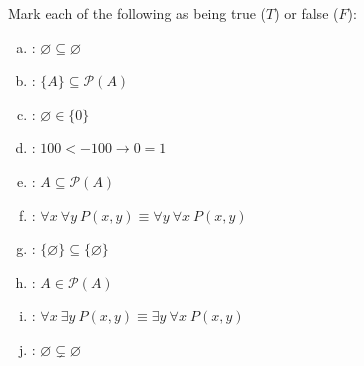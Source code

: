 \documentclass[12pt,letterpaper]{exam}
\begin{document}
\begin{questions}
\newpage
\question[10] Mark each of the following as being true ($T$) or false ($F$): \pspace
        \begin{enumerate}[(a)]
        \item \underline{\hspace{1.5cm}}: $\varnothing \subseteq \varnothing$ \vfill
        \item \underline{\hspace{1.5cm}}: $\{ A \} \subseteq \mathcal{P}(A)$ \vfill
        \item \underline{\hspace{1.5cm}}: $\varnothing \in \{ 0 \}$ \vfill
        \item \underline{\hspace{1.5cm}}: $100 < -100 \to 0= 1$ \vfill
        \item \underline{\hspace{1.5cm}}: $A \subseteq \mathcal{P}(A)$ \vfill
        \item \underline{\hspace{1.5cm}}: $\forall x\ \forall y\ P(x, y) \equiv \forall y\ \forall x\ P(x, y)$ \vfill
        \item \underline{\hspace{1.5cm}}: $\{ \varnothing \} \subseteq \{ \varnothing \}$ \vfill
        \item \underline{\hspace{1.5cm}}: $A \in \mathcal{P}(A)$ \vfill
        \item \underline{\hspace{1.5cm}}: $\forall x\ \exists y\ P(x, y) \equiv \exists y\ \forall x\ P(x, y)$ \vfill
        \item \underline{\hspace{1.5cm}}: $\varnothing \subsetneq \varnothing$ \vfill
        \end{enumerate}


\end{questions}
\end{document}
